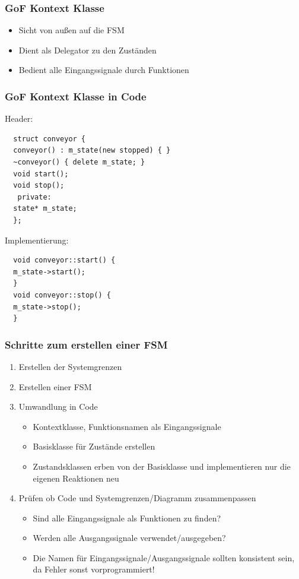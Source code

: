 \documentclass{beamer}
\begin{document}
\begin{frame}
 \frametitle{GoF Kontext Klasse}
 \begin{itemize}
  \item Sicht von au{\ss}en auf die FSM
  \item Dient als Delegator zu den Zust\"anden
  \item Bedient alle Eingangssignale durch Funktionen
 \end{itemize}
\end{frame}

\begin{frame}[fragile]
 \frametitle{GoF Kontext Klasse in Code}
 Header:
 \begin{lstlisting}
  struct conveyor {
  conveyor() : m_state(new stopped) { }
  ~conveyor() { delete m_state; }
  void start();
  void stop();
   private:
  state* m_state;
  };
 \end{lstlisting}
 Implementierung:
 \begin{lstlisting}
  void conveyor::start() {
  m_state->start();
  }
  void conveyor::stop() {
  m_state->stop();
  }
 \end{lstlisting}
\end{frame}

\begin{frame}
 \frametitle{Schritte zum erstellen einer FSM}
 \begin{enumerate}
  \item Erstellen der Systemgrenzen
  \item Erstellen einer FSM
  \item Umwandlung in Code
  \begin{itemize}
   \item Kontextklasse, Funktionsnamen als Eingangssignale
   \item Basisklasse f\"ur Zust\"ande erstellen
   \item Zustandsklassen erben von der Basisklasse und implementieren nur die eigenen Reaktionen neu
  \end{itemize}
  \item Pr\"ufen ob Code und Systemgrenzen/Diagramm zusammenpassen
  \begin{itemize}
   \item Sind alle Eingangssignale als Funktionen zu finden?
   \item Werden alle Ausgangssignale verwendet/ausgegeben?
   \item Die Namen f\"ur Eingangssignale/Ausgangssignale sollten konsistent sein, da Fehler sonst vorprogrammiert!
  \end{itemize}
 \end{enumerate}
\end{frame}
\end{document}
